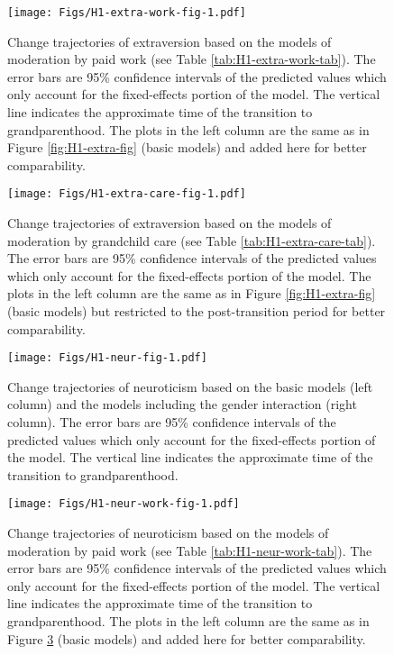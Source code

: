 \documentclass[
  english,
  man, noextraspace]{apa7}
\begin{document}
\begin{appendix}
\begin{figure}
\centering
\texttt{[image: Figs/H1-extra-work-fig-1.pdf]}
\caption{\label{fig:H1-extra-work-fig}Change trajectories of extraversion based on
the models of moderation by paid work (see Table
\ref{tab:H1-extra-work-tab}). The error bars are 95\% confidence
intervals of the predicted values which only account for the
fixed-effects portion of the model. The vertical line indicates the
approximate time of the transition to grandparenthood. The plots in the
left column are the same as in Figure \ref{fig:H1-extra-fig} (basic
models) and added here for better comparability.}
\end{figure}









\begin{figure}
\centering
\texttt{[image: Figs/H1-extra-care-fig-1.pdf]}
\caption{\label{fig:H1-extra-care-fig}Change trajectories of extraversion based on
the models of moderation by grandchild care (see Table
\ref{tab:H1-extra-care-tab}). The error bars are 95\% confidence
intervals of the predicted values which only account for the
fixed-effects portion of the model. The plots in the left column are the
same as in Figure \ref{fig:H1-extra-fig} (basic models) but restricted
to the post-transition period for better comparability.}
\end{figure}








\begin{figure}
\centering
\texttt{[image: Figs/H1-neur-fig-1.pdf]}
\caption{\label{fig:H1-neur-fig}Change trajectories of neuroticism based on the
basic models (left column) and the models including the gender
interaction (right column). The error bars are 95\% confidence intervals
of the predicted values which only account for the fixed-effects portion
of the model. The vertical line indicates the approximate time of the
transition to grandparenthood.}
\end{figure}










\begin{figure}
\centering
\texttt{[image: Figs/H1-neur-work-fig-1.pdf]}
\caption{\label{fig:H1-neur-work-fig}Change trajectories of neuroticism based on
the models of moderation by paid work (see Table
\ref{tab:H1-neur-work-tab}). The error bars are 95\% confidence
intervals of the predicted values which only account for the
fixed-effects portion of the model. The vertical line indicates the
approximate time of the transition to grandparenthood. The plots in the
left column are the same as in Figure \ref{fig:H1-neur-fig} (basic
models) and added here for better comparability.}
\end{figure}










\end{appendix}
\end{document}
